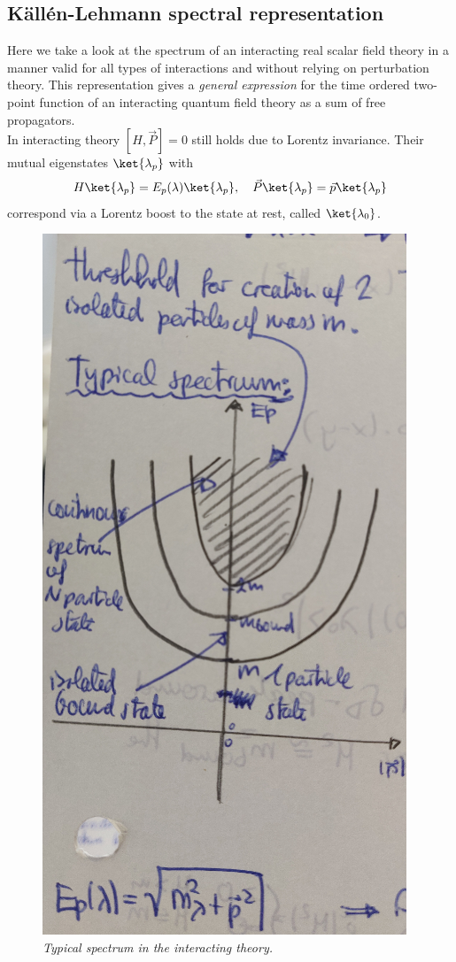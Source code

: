 \subsection{Källén-Lehmann spectral representation}
Here we take a look at the spectrum of an interacting real scalar field theory in a manner valid for all types of interactions and without relying on perturbation theory. This representation gives a \emph{general expression} for the time ordered two-point function of an interacting quantum field theory as a sum of free propagators.\\
In interacting theory $[H,\vec{P}]=0$ still holds due  to Lorentz invariance. Their mutual eigenstates $\ket{\lambda_p}$ with
\begin{equation}
	H\ket{\lambda_p}=E_p(\lambda) \ket{\lambda_p}, \quad \vec{P}\ket{\lambda_p} = \vec{p} \ket{\lambda_p}
\end{equation}
correspond via a Lorentz boost to the state at rest, called $\ket{\lambda_0}$.\\
\begin{figure}
	\centering
	\includegraphics[width=0.7\linewidth]{gfx/Spectruminteractingtheory}
	\caption{\itshape Typical spectrum in the interacting theory.}
	\label{fig:spectruminteractingtheory}
\end{figure}
